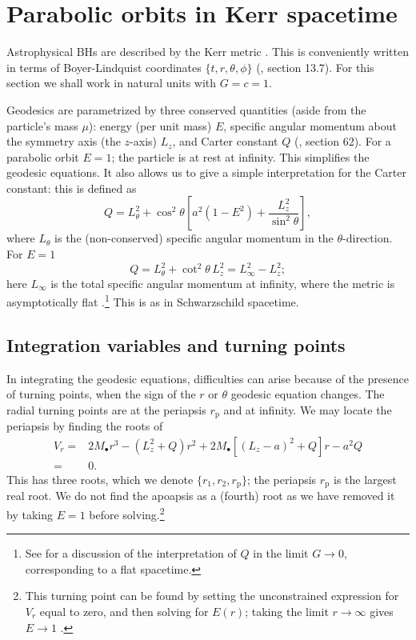 \documentclass[useAMS,usedcolumn,usegraphicx,usenatbib]{mn2e}
\newcommand{\sub}[1]{\ensuremath{_\mathrm{#1}}}
\begin{document}
\section{Parabolic orbits in Kerr spacetime}\label{sec:Geodesic}

Astrophysical BHs are described by the Kerr metric \citep{Kerr1963}. This is conveniently written in terms of Boyer-Lindquist coordinates $\{t, r, \theta, \phi\}$ (\citealt*{Boyer1967, Hobson2006}, section 13.7). For this section we shall work in natural units with $G = c = 1$.

Geodesics are parametrized by three conserved quantities (aside from the particle's mass $\mu$): energy (per unit mass) $E$, specific angular momentum about the symmetry axis (the $z$-axis) $L_z$, and Carter constant $Q$ (\citealt{Carter1968, Chandrasekhar1998}, section 62). For a parabolic orbit $E = 1$; the particle is at rest at infinity. This simplifies the geodesic equations. It also allows us to give a simple interpretation for the Carter constant: this is defined as
\begin{equation}
Q = L_\theta^2 + \cos^2\theta\left[a^2\left(1 - E^2\right) + \frac{L_z^2}{\sin^2\theta}\right],
\end{equation}
where $L_\theta$ is the (non-conserved) specific angular momentum in the $\theta$-direction. For $E = 1$
\begin{equation}
Q = L_\theta^2 + \cot^2\theta\, L_z^2 = L_\infty^2 - L_z^2;
\end{equation}
here $L_\infty$ is the total specific angular momentum at infinity, where the metric is asymptotically flat \citep{DeFelice1980}.\footnote{See \citet*{Rosquist2009} for a discussion of the interpretation of $Q$ in the limit $G \rightarrow 0$, corresponding to a flat spacetime.} This is as in Schwarzschild spacetime.

\subsection{Integration variables and turning points}

In integrating the geodesic equations, difficulties can arise because of the presence of turning points, when the sign of the $r$ or $\theta$ geodesic equation changes. The radial turning points are at the periapsis $r\sub{p}$ and at infinity. We may locate the periapsis by finding the roots of
\begin{align}
V_r = {} & 2M_\bullet r^3 - \left(L_z^2+Q\right)r^2 + 2M_\bullet\left[\left(L_z - a\right)^2 + Q\right]r - a^2 Q \nonumber \\
 = {} & 0.
\end{align}
This has three roots, which we denote $\{r_1, r_2, r\sub{p}\}$; the periapsis $r\sub{p}$ is the largest real root. We do not find the apoapsis as a (fourth) root as we have removed it by taking $E = 1$ before solving.\footnote{This turning point can be found by setting the unconstrained expression for $V_r$ equal to zero, and then solving for $E(r)$; taking the limit $r \rightarrow \infty$ gives $E \rightarrow 1$ \citep{Wilkins1972}.}
\end{document}
